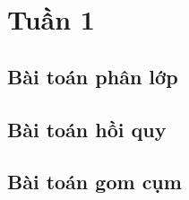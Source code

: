 \newpage
\section{Tuần 1}
\subsection{Bài toán phân lớp}
\subsection{Bài toán hồi quy}
\subsection{Bài toán gom cụm}